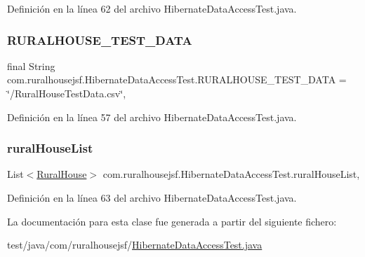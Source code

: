 Definición en la línea 62 del archivo Hibernate\+Data\+Access\+Test.\+java.

\mbox{\label{classcom_1_1ruralhousejsf_1_1_hibernate_data_access_test_a9f9d6116edd1cdeb60cf726a921d148f}} 
\subsubsection{\texorpdfstring{RURALHOUSE\_TEST\_DATA}{RURALHOUSE\_TEST\_DATA}}
{\footnotesize\ttfamily final String com.\+ruralhousejsf.\+Hibernate\+Data\+Access\+Test.\+R\+U\+R\+A\+L\+H\+O\+U\+S\+E\+\_\+\+T\+E\+S\+T\+\_\+\+D\+A\+TA = \char`\"{}/Rural\+House\+Test\+Data.\+csv\char`\"{}\hspace{0.3cm}{\ttfamily [static]}, {\ttfamily [package]}}



Definición en la línea 57 del archivo Hibernate\+Data\+Access\+Test.\+java.

\mbox{\label{classcom_1_1ruralhousejsf_1_1_hibernate_data_access_test_a989d035f20b8a64527db2fbbd411943e}} 
\subsubsection{\texorpdfstring{ruralHouseList}{ruralHouseList}}
{\footnotesize\ttfamily List$<$\mbox{\hyperlink{classcom_1_1ruralhousejsf_1_1domain_1_1_rural_house}{Rural\+House}}$>$ com.\+ruralhousejsf.\+Hibernate\+Data\+Access\+Test.\+rural\+House\+List\hspace{0.3cm}{\ttfamily [static]}, {\ttfamily [package]}}



Definición en la línea 63 del archivo Hibernate\+Data\+Access\+Test.\+java.



La documentación para esta clase fue generada a partir del siguiente fichero\+:\begin{DoxyCompactItemize}
\item 
test/java/com/ruralhousejsf/\mbox{\hyperlink{_hibernate_data_access_test_8java}{Hibernate\+Data\+Access\+Test.\+java}}\end{DoxyCompactItemize}
